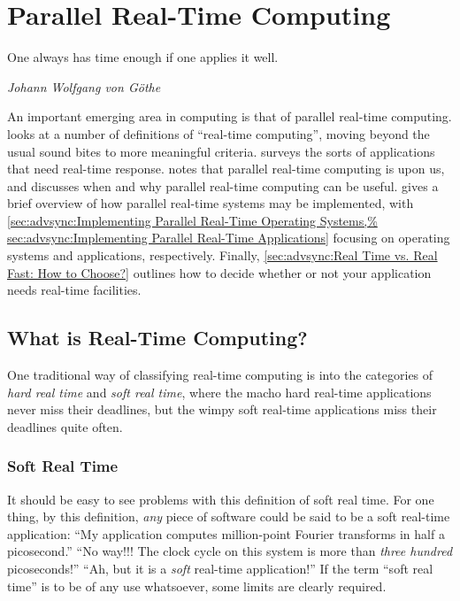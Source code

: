 
\section{Parallel Real-Time Computing}
\label{sec:advsync:Parallel Real-Time Computing}
%
\epigraph{One always has time enough if one applies it well.}
	 {\emph{Johann Wolfgang von G\"othe}}

An important emerging area in computing is that of parallel real-time
computing.
looks at a number of definitions of ``real-time computing'', moving
beyond the usual sound bites to more meaningful criteria.
surveys the sorts of applications that need real-time response.
notes that parallel real-time computing is upon us, and discusses
when and why parallel real-time computing can be useful.
gives a brief overview of how parallel real-time systems may be implemented,
with
\cref{sec:advsync:Implementing Parallel Real-Time Operating Systems,%
sec:advsync:Implementing Parallel Real-Time Applications}
focusing on operating systems and applications, respectively.
Finally,
\cref{sec:advsync:Real Time vs. Real Fast: How to Choose?}
outlines how to decide whether or not your application needs real-time
facilities.

\subsection{What is Real-Time Computing?}
\label{sec:advsync:What is Real-Time Computing?}

One traditional way of classifying real-time computing is into the
categories of \emph{hard real time} and \emph{soft real time}, where
the macho hard real-time applications never miss their deadlines, but
the wimpy soft real-time applications miss their deadlines quite often.

\subsubsection{Soft Real Time}
\label{sec:Soft Real Time}

It should be easy to see problems with this definition of soft real time.
For one thing, by this definition, \emph{any} piece of software could be
said to be a soft real-time application:
``My application computes million-point Fourier transforms in half a
picosecond.''
``No way!!!
The clock cycle on this system is more than \emph{three hundred} picoseconds!''
``Ah, but it is a \emph{soft} real-time application!''
If the term ``soft real time'' is to be of any use whatsoever, some limits
are clearly required.

